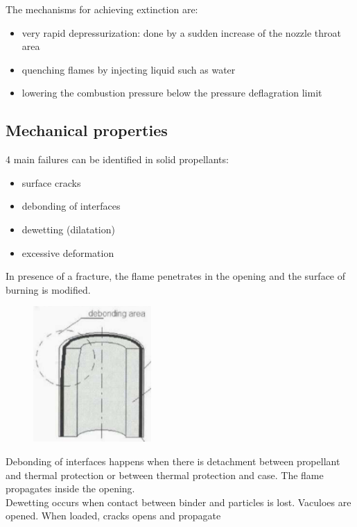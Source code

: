 \documentclass[12pt]{article}
\begin{document}
The mechanisms for achieving extinction are:
\begin{itemize}
  \item very rapid depressurization: done by a sudden increase of the nozzle throat area
  \item quenching flames by injecting liquid such as water
  \item lowering the combustion pressure below the pressure deflagration limit
\end{itemize}

\subsection{Mechanical properties}

4 main failures can be identified in solid propellants:
\begin{itemize}
  \item surface cracks
  \item debonding of interfaces
  \item dewetting (dilatation)
  \item excessive deformation
\end{itemize}

In presence of a fracture, the flame penetrates in the opening and the surface of burning is modified.

\begin{figure}[!ht]
\centering
\includegraphics[width=0.4\textwidth]{figures/debo.png}
\end{figure}

Debonding of interfaces happens when there is detachment between propellant and thermal protection or between thermal protection and case. The flame propagates inside the opening.\\
Dewetting occurs when contact between binder and particles is lost. Vaculoes are opened. When loaded, cracks opens and propagate
\end{document}
